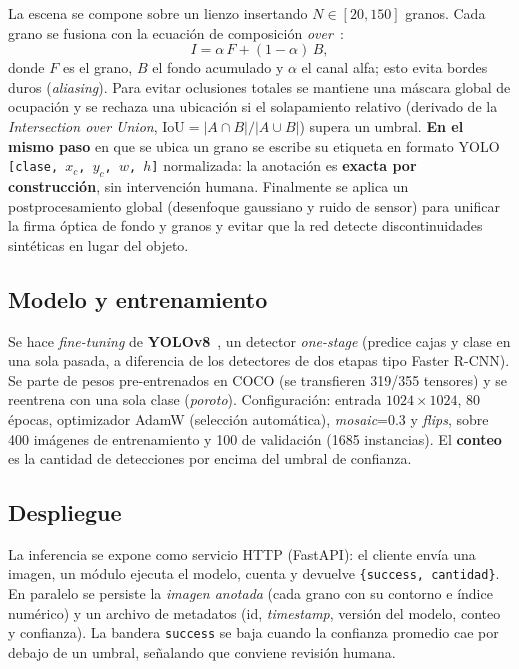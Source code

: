 \documentclass[conference]{IEEEtran}
\begin{document}
La escena se compone sobre un lienzo insertando $N\in[20,150]$ granos. Cada grano
se fusiona con la ecuación de composición \emph{over}~\cite{porterduff}:
\begin{equation}
I = \alpha\,F + (1-\alpha)\,B,
\end{equation}
donde $F$ es el grano, $B$ el fondo acumulado y $\alpha$ el canal alfa; esto evita
bordes duros (\textit{aliasing}). Para evitar oclusiones totales se mantiene una
máscara global de ocupación y se rechaza una ubicación si el solapamiento relativo
(derivado de la \textit{Intersection over Union}, $\mathrm{IoU}=|A\cap B|/|A\cup
B|$) supera un umbral. \textbf{En el mismo paso} en que se ubica un grano se
escribe su etiqueta en formato YOLO \texttt{[clase, $x_c$, $y_c$, $w$, $h$]}
normalizada: la anotación es \textbf{exacta por construcción}, sin intervención
humana. Finalmente se aplica un postprocesamiento global (desenfoque gaussiano y
ruido de sensor) para unificar la firma óptica de fondo y granos y evitar que la
red detecte discontinuidades sintéticas en lugar del objeto.


\subsection{Modelo y entrenamiento}
Se hace \textit{fine-tuning} de \textbf{YOLOv8}~\cite{yolov8}, un detector
\textit{one-stage} (predice cajas y clase en una sola pasada, a diferencia de los
detectores de dos etapas tipo Faster R-CNN). Se parte de pesos pre-entrenados en
COCO (se transfieren 319/355 tensores) y se reentrena con una sola clase
(\emph{poroto}). Configuración: entrada $1024\times1024$, 80 épocas, optimizador
AdamW (selección automática), \textit{mosaic}=0.3 y \textit{flips}, sobre 400
imágenes de entrenamiento y 100 de validación (1685 instancias). El \textbf{conteo}
es la cantidad de detecciones por encima del umbral de confianza.

\subsection{Despliegue}
La inferencia se expone como servicio HTTP (FastAPI): el cliente envía una imagen,
un módulo ejecuta el modelo, cuenta y devuelve \texttt{\{success, cantidad\}}. En
paralelo se persiste la \emph{imagen anotada} (cada grano con su contorno e índice
numérico) y un archivo de metadatos (id, \textit{timestamp}, versión del modelo,
conteo y confianza). La bandera \texttt{success} se baja cuando la confianza
promedio cae por debajo de un umbral, señalando que conviene revisión humana.
\end{document}
